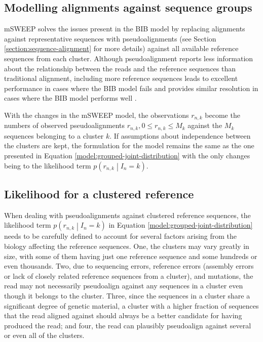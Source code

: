 \documentclass[officiallayout]{tktla}
\begin{document}
\subsection{Modelling alignments against sequence groups}

mSWEEP solves the issues present in the BIB model by replacing
alignments against representative sequences with pseudoalignments (see
Section \ref{section:sequence-alignment} for more details) against all
available reference sequences from each cluster. Although
pseudoalignment reports less information about the relationship
between the reads and the reference sequences than traditional
alignment, including more reference sequences leads to excellent
performance in cases where the BIB model fails and provides similar
resolution in cases where the BIB model performs well
\citep{maklin_high-resolution_2021}.

With the changes in the mSWEEP model, the observations $r_{n, k}$
become the numbers of observed pseudoalignments $r_{n, k}, 0 \leq
r_{n, k} \leq M_{k}$ against the $M_{k}$ sequences belonging to a
cluster $k$. If assumptions about independence between the clusters
are kept, the formulation for the model remains the same as the one
presented in Equation \ref{model:grouped-joint-distribution} with the
only changes being to the likelihood term $p\left(r_{n, k} \middle|
I_{n} = k\right)$.


\subsection{Likelihood for a clustered reference}

When dealing with pseudoalignments against clustered reference
sequences, the likelihood term $p\left(r_{n, k} \middle| I_{n} =
k\right)$ in Equation \ref{model:grouped-joint-distribution} needs to
be carefully defined to account for several factors arising from the
biology affecting the reference sequences. One, the clusters may vary
greatly in size, with some of them having just one reference sequence
and some hundreds or even thousands. Two, due to sequencing errors,
reference errors (assembly errors or lack of closely related reference
sequences from a cluster), and mutations, the read may not necessarily
pseudoalign against any sequences in a cluster even though it belongs
to the cluster. Three, since the sequences in a cluster share a
significant degree of genetic material, a cluster with a higher
fraction of sequences that the read aligned against should always be a
better candidate for having produced the read; and four, the read can
plausibly pseudoalign against several or even all of the clusters.
\end{document}
